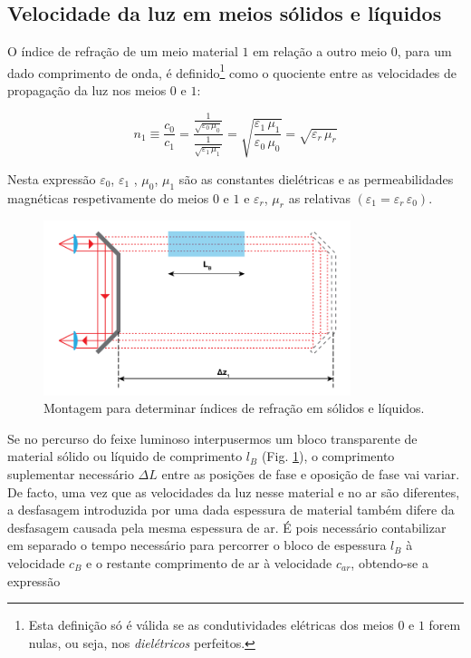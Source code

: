 \documentclass[a4paper,12pt]{article}      %
\begin{document}
\subsection{\sf Velocidade da luz em meios sólidos e líquidos}
 O índice de refração de um meio material $1$ em relação a outro meio $0$, para um dado comprimento de onda, é definido\footnote{Esta definição só é válida se as condutividades elétricas dos meios $0$ e $1$ forem nulas, ou seja, nos \emph{dielétricos} perfeitos.}
 como o quociente entre as velocidades de propagação da luz nos meios $0$ e $1$:

 \begin{equation}
	\label{eq:index}
	n_1 \equiv \frac{c_0}{c_1}  = \frac{\frac{1}{\sqrt{\varepsilon_0 \, \mu_0}} }{\frac{1}{\sqrt{\varepsilon_1 \, \mu_1}} } =
		\sqrt{\frac{\varepsilon_1 \, \mu_1}{\varepsilon_0 \, \mu_0}} = \sqrt{\varepsilon_r \, \mu_r}
\end{equation}

Nesta expressão $\varepsilon_0$, $\varepsilon_1$ ,	 $\mu_0$, $\mu_1$ são as constantes dielétricas e as permeabilidades magnéticas respetivamente do meios $0$ e $1$ e $\varepsilon_r$, $\mu_r$    as relativas $(\varepsilon_1= \varepsilon_r\, \varepsilon_0)$.

\begin{figure}[h!tb]  
	\centering 
	\includegraphics[width=0.8\textwidth]{esquema2}
	\caption{Montagem para determinar índices de refração em sólidos e líquidos. \label{fig:Montagem_bloco}} 
\end{figure}

Se no percurso do feixe luminoso interpusermos um bloco transparente de material sólido ou líquido de comprimento $l_B$ (Fig. \ref{fig:Montagem_bloco}), o comprimento suplementar necessário $\Delta L$ entre as posições de fase e oposição de fase vai variar. De facto, uma vez que as velocidades da luz nesse material e no ar são diferentes, a desfasagem introduzida por uma dada espessura de material também difere da desfasagem causada pela mesma espessura de ar. É pois necessário contabilizar em separado o tempo necessário para percorrer o bloco de espessura $l_B$ à velocidade $c_B$ e o restante comprimento de ar à velocidade $c_{ar}$, obtendo-se a expressão
\end{document}
